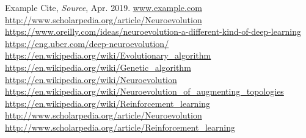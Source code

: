 \documentclass[journal, a4paper]{IEEEtran}
\begin{document}
\begin{thebibliography}{5}

    Example Cite, {\em Source}, Apr. 2019.
    \url{www.example.com}
    \url{http://www.scholarpedia.org/article/Neuroevolution}
    \url{https://www.oreilly.com/ideas/neuroevolution-a-different-kind-of-deep-learning}
    \url{https://eng.uber.com/deep-neuroevolution/}
    \url{https://en.wikipedia.org/wiki/Evolutionary_algorithm}
    \url{https://en.wikipedia.org/wiki/Genetic_algorithm}
    \url{https://en.wikipedia.org/wiki/Neuroevolution}
    \url{https://en.wikipedia.org/wiki/Neuroevolution_of_augmenting_topologies}
    \url{https://en.wikipedia.org/wiki/Reinforcement_learning}
    \url{http://www.scholarpedia.org/article/Neuroevolution}
    \url{http://www.scholarpedia.org/article/Reinforcement_learning}

\end{thebibliography}
\end{document}
